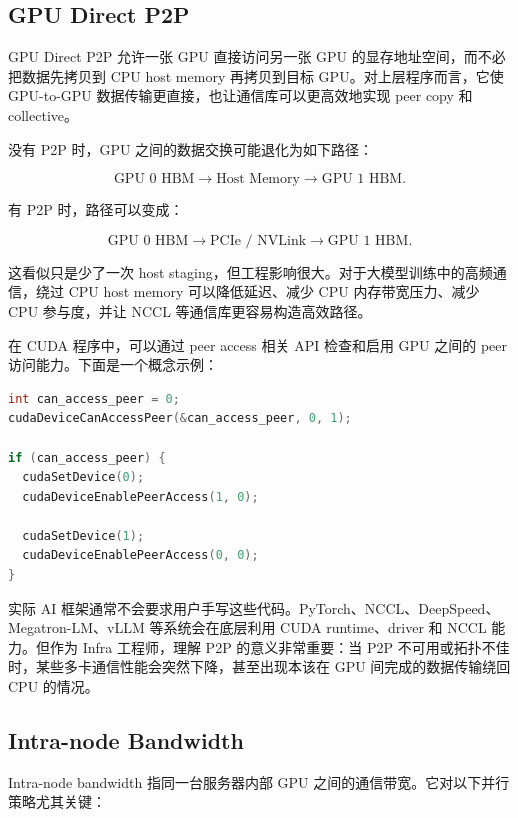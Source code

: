 \subsection{GPU Direct P2P}
\label{subsec:gpu-direct-p2p}

GPU Direct P2P 允许一张 GPU 直接访问另一张 GPU 的显存地址空间，而不必把数据先拷贝到 CPU host memory 再拷贝到目标 GPU。对上层程序而言，它使 GPU-to-GPU 数据传输更直接，也让通信库可以更高效地实现 peer copy 和 collective。

没有 P2P 时，GPU 之间的数据交换可能退化为如下路径：

\[
  \text{GPU 0 HBM} \rightarrow \text{Host Memory} \rightarrow \text{GPU 1 HBM}.
\]

有 P2P 时，路径可以变成：

\[
  \text{GPU 0 HBM} \rightarrow \text{PCIe / NVLink} \rightarrow \text{GPU 1 HBM}.
\]

这看似只是少了一次 host staging，但工程影响很大。对于大模型训练中的高频通信，绕过 CPU host memory 可以降低延迟、减少 CPU 内存带宽压力、减少 CPU 参与度，并让 NCCL 等通信库更容易构造高效路径。

在 CUDA 程序中，可以通过 peer access 相关 API 检查和启用 GPU 之间的 peer 访问能力。下面是一个概念示例：

\begin{lstlisting}[language=C++,caption={检查并启用 GPU peer access 的概念代码},label={lst:cuda-peer-access}]
int can_access_peer = 0;
cudaDeviceCanAccessPeer(&can_access_peer, 0, 1);

if (can_access_peer) {
  cudaSetDevice(0);
  cudaDeviceEnablePeerAccess(1, 0);

  cudaSetDevice(1);
  cudaDeviceEnablePeerAccess(0, 0);
}
\end{lstlisting}

实际 AI 框架通常不会要求用户手写这些代码。PyTorch、NCCL、DeepSpeed、Megatron-LM、vLLM 等系统会在底层利用 CUDA runtime、driver 和 NCCL 能力。但作为 Infra 工程师，理解 P2P 的意义非常重要：当 P2P 不可用或拓扑不佳时，某些多卡通信性能会突然下降，甚至出现本该在 GPU 间完成的数据传输绕回 CPU 的情况。

\subsection{Intra-node Bandwidth}
\label{subsec:intra-node-bandwidth}

Intra-node bandwidth 指同一台服务器内部 GPU 之间的通信带宽。它对以下并行策略尤其关键：

